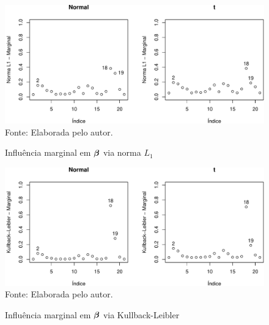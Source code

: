 \begin{figure}[h]
\begin{center}
\caption{Influência marginal em ${\boldsymbol{\beta}}$ via norma $L_1$}
\label{fig:chap02_l1_marg}
\includegraphics[width=\textwidth]{figuras/chap02_l1_marg.pdf}
\\ Fonte: Elaborada pelo autor.
\end{center}
\end{figure}

\begin{figure}[h]
\begin{center}
\caption{Influência marginal em ${\boldsymbol{\beta}}$ via Kullback-Leibler}
\label{fig:chap02_kl_marg}
\includegraphics[width=\textwidth]{figuras/chap02_kl_marg.pdf}
\\ Fonte: Elaborada pelo autor.
\end{center}
\end{figure}

